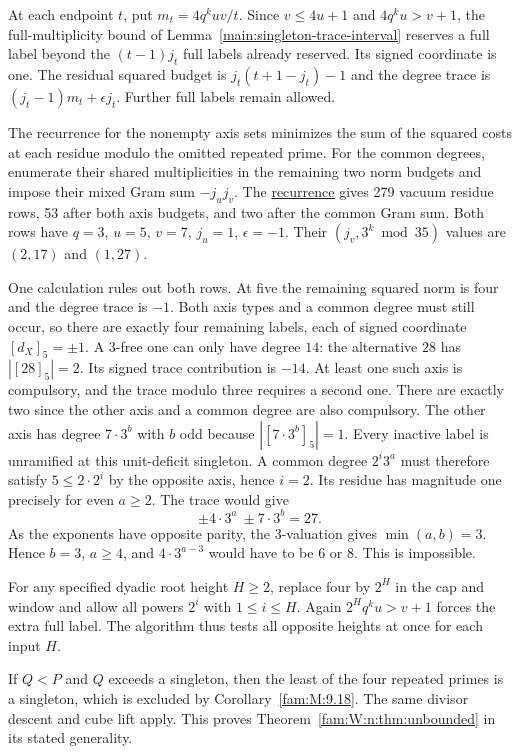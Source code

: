 \documentclass[11pt,a4paper]{article}
\numberwithin{equation}{section}
\theoremstyle{remark}
\begin{document}
At each endpoint $t$, put $m_t=4q^k uv/t$. Since $v\le4u+1$
and $4q^ku>v+1$, the full-multiplicity bound
of Lemma~\ref{main:singleton-trace-interval} reserves a full label beyond
the $(t-1)j_t$ full labels already reserved. Its signed coordinate is one. The residual
squared budget is $j_t(t+1-j_t)-1$ and the degree trace is
$(j_t-1)m_t+\epsilon j_t$. Further full labels remain allowed.

The recurrence for the nonempty axis sets minimizes the sum of the
squared costs at each residue modulo the omitted repeated prime.
For the common degrees, enumerate their shared multiplicities in
the remaining two norm budgets and impose their mixed Gram sum
$-j_uj_v$. The \href{https://github.com/sebastienpalcoux/WGT-fusion-categories/blob/f7f9f9a02f3116e61eb9dca4eebfed77001494e8/code/four_primes/unbounded_four.py}{recurrence} gives 279 vacuum residue rows,
53 after both axis budgets, and two after the common Gram sum.
Both rows have $q=3$, $u=5$, $v=7$, $j_u=1$, $\epsilon=-1$.
Their $(j_v,3^k\bmod35)$ values are $(2,17)$ and $(1,27)$.

One calculation rules out both rows. At five the remaining squared
norm is four and the degree trace is $-1$. Both axis types and a
common degree must still occur, so there are exactly four remaining
labels, each of signed coordinate $[d_X]_5=\pm1$. A $3$-free
one can only have degree $14$: the alternative $28$ has
$|[28]_5|=2$. Its signed trace contribution is $-14$. At least
one such axis is compulsory, and the trace modulo three requires
a second one. There are exactly two since the other axis and a
common degree are also compulsory. The other axis has degree
$7\cdot3^b$ with $b$ odd because $|[7\cdot3^b]_5|=1$. Every
inactive label is unramified at this unit-deficit singleton.
A common degree $2^i3^a$ must therefore satisfy
$5\le2\cdot 2^i$ by the opposite axis, hence $i=2$.
Its residue has magnitude one precisely for even $a\ge2$.
The trace would give
\[
               \pm4\cdot3^a\ \pm7\cdot3^b=27.
\]
As the exponents have opposite parity, the $3$-valuation gives
$\min(a,b)=3$. Hence $b=3$, $a\ge4$, and
$4\cdot3^{a-3}$ would have to be $6$ or $8$. This is impossible.

For any specified dyadic root height $H\ge2$, replace four by $2^H$
in the cap and window and allow all powers $2^i$ with $1\le i\le H$.
Again $2^Hq^ku>v+1$ forces the extra full label. The algorithm thus
tests all opposite heights at once for each input $H$.

If $Q<P$ and $Q$ exceeds a singleton, then the least of the four
repeated primes is a singleton, which is excluded by
Corollary~\ref{fam:M:9.18}. The same divisor descent and cube lift apply.
This proves Theorem~\ref{fam:W:n:thm:unbounded} in its stated generality.
\end{document}
